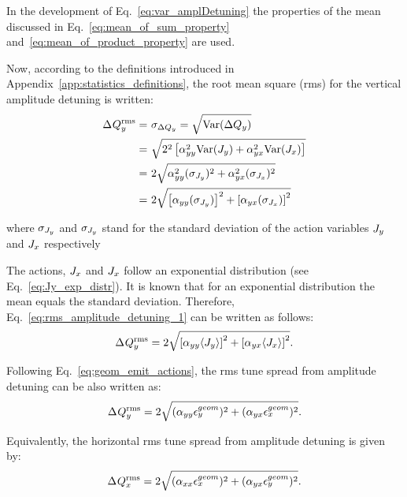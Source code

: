In the development of Eq.~\ref{eq:var_amplDetuning} the properties of the mean discussed in Eq.~\eqref{eq:mean_of_sum_property} and~\eqref{eq:mean_of_product_property} are used.


Now, according to the definitions introduced in Appendix~\ref{app:statistics_definitions}, the root mean square (rms) for the vertical amplitude detuning is written:
\begin{equation}\label{eq:rms_amplitude_detuning_1}
    \begin{split}
    {\Delta\: \!Q^\mathrm{rms}_{y}} =&~\sigma_{\Delta Q_y}=\sqrt{\mathrm{Var}(\Delta Q_y)}\\
    =&~\sqrt{2^2\left [ \alpha_{yy}^2 \mathrm{Var}(J_y) + \alpha_{yx}^2 \mathrm{Var}(J_x) \right ]}\\
    =&~2 \sqrt{\alpha_{yy}^2 (\sigma_{J_y})^2 + \alpha_{yx}^2 (\sigma_{J_x})^2 }\\
    =&~2 \sqrt{\left [\alpha_{yy} (\sigma_{J_y})\right ]^2 + \left [ \alpha_{yx} (\sigma_{J_x}) \right ]^2 }
    \end{split}
\end{equation}

where $\sigma_{{J_y}}$ and $\sigma_{{J_y}}$ stand for the standard deviation of the action variables ${J_y}$ and ${J_x}$ respectively

The actions, ${J_x}$ and ${J_x}$ follow an exponential distribution (see Eq.~\eqref{eq:Jy_exp_distr}). It is known that for an exponential distribution the mean equals the standard deviation. Therefore, Eq.~\ref{eq:rms_amplitude_detuning_1} can be written as follows:
\begin{equation}\label{eq:rms_amplitute_detuning_2}
    {\Delta\: \!Q^\mathrm{rms}_{y}} = 2 \sqrt{\left [\alpha_{yy} \langle {J_y} \rangle \right ]^2 + \left [ \alpha_{yx} \langle {J_x} \rangle \right ]^2 }.
\end{equation}

Following Eq.~\eqref{eq:geom_emit_actions}, the rms tune spread from amplitude detuning can be also written as:
\begin{equation}\label{eq:rms_amplitute_detuning_3}
    {\Delta\: \!Q^\mathrm{rms}_{y}} = 2 \sqrt{(\alpha_{yy} {\epsilon_y^{geom}} )^2 + ( \alpha_{yx} {\epsilon_x^{geom}})^2 }.
\end{equation}

Equivalently, the horizontal rms tune spread from amplitude detuning is given by:
\begin{equation}\label{eq:rms_amplitute_detuning_3_x}
    {\Delta\: \!Q^\mathrm{rms}_{x}} = 2 \sqrt{(\alpha_{xx} {\epsilon_x^{geom}} )^2 + ( \alpha_{yx} {\epsilon_y^{geom}})^2 }.
\end{equation}


